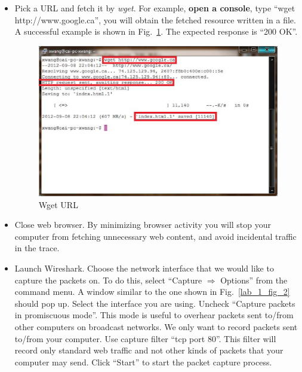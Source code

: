 \begin{itemize}
\item Pick a URL and fetch it by {\em wget}. For example, \textbf{open a console}, type ``wget http://www.google.ca'', you will obtain the fetched resource written in a file. A successful example is shown in Fig.~\ref{lab_1_wget_url}. The expected response is ``200 OK''. 


\begin{figure}[!t]
\centering
\includegraphics[width=0.8\columnwidth]{figs/lab_1_wget_url.eps}
\caption{Wget URL}\label{lab_1_wget_url}
\end{figure}

\item Close web browser. By minimizing browser activity you will stop your computer from fetching unnecessary web content, and avoid incidental traffic in the trace.

\item Launch Wireshark. Choose the network interface that we would
  like to capture the packets on. To do this, select ``Capture
  $\Rightarrow$ Options'' from the command menu. A window similar to
  the one shown in Fig.~\ref{lab_1_fig_2} should pop up. Select the
  interface you are using. Uncheck ``Capture packets in promiscuous 
  mode''. This mode is useful to overhear packets sent to/from other 
  computers on broadcast networks. We only want to record packets 
  sent to/from your computer. Use capture filter ``tcp port 80''. 
  This filter will record only standard web traffic and not other 
  kinds of packets that your computer may send. Click ``Start'' to 
  start the packet capture process.
 

\end{itemize}
